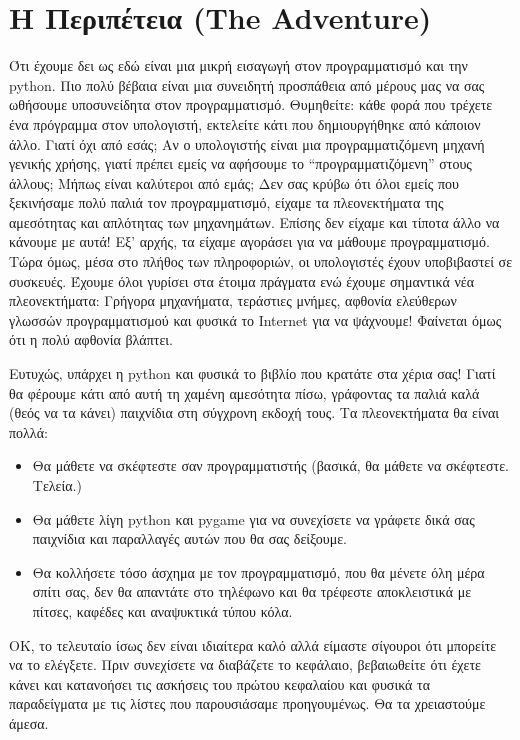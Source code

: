 \section {Η Περιπέτεια (The Adventure)}
%
Ότι έχουμε δει ως εδώ είναι μια μικρή εισαγωγή στον προγραμματισμό και την
python. Πιο πολύ βέβαια είναι μια συνειδητή προσπάθεια από μέρους
μας να σας ωθήσουμε υποσυνείδητα στον προγραμματισμό. Θυμηθείτε: κάθε φορά
που τρέχετε ένα πρόγραμμα στον υπολογιστή, εκτελείτε κάτι που δημιουργήθηκε
από κάποιον άλλο. Γιατί όχι από εσάς; Αν ο υπολογιστής είναι μια
προγραμματιζόμενη μηχανή γενικής χρήσης, γιατί πρέπει εμείς να αφήσουμε το
``προγραμματιζόμενη'' στους άλλους; Μήπως είναι καλύτεροι από εμάς;
Δεν σας κρύβω ότι όλοι εμείς που ξεκινήσαμε πολύ παλιά τον
προγραμματισμό, είχαμε τα πλεονεκτήματα της αμεσότητας και απλότητας των
μηχανημάτων. Επίσης δεν είχαμε και τίποτα άλλο να κάνουμε με αυτά! Εξ'
αρχής, τα είχαμε αγοράσει για να μάθουμε προγραμματισμό. Τώρα όμως, μέσα στο
πλήθος των πληροφοριών, οι υπολογιστές έχουν υποβιβαστεί σε συσκευές. Έχουμε
όλοι γυρίσει στα έτοιμα πράγματα ενώ έχουμε σημαντικά νέα πλεονεκτήματα:
Γρήγορα μηχανήματα, τεράστιες μνήμες, αφθονία ελεύθερων γλωσσών
προγραμματισμού και φυσικά το Internet για να ψάχνουμε! Φαίνεται όμως ότι η
πολύ αφθονία βλάπτει.

Ευτυχώς, υπάρχει η python και φυσικά το βιβλίο που κρατάτε στα χέρια σας!
Γιατί θα φέρουμε κάτι από αυτή τη χαμένη αμεσότητα πίσω, γράφοντας τα παλιά
καλά (θεός να τα κάνει) παιχνίδια στη σύγχρονη εκδοχή τους. Τα πλεονεκτήματα
θα είναι πολλά:
%
\begin{itemize}
\item Θα μάθετε να σκέφτεστε σαν προγραμματιστής (βασικά, θα μάθετε να σκέφτεστε.  Τελεία.)
\item Θα μάθετε λίγη python και pygame για να συνεχίσετε να γράφετε δικά σας παιχνίδια και παραλλαγές αυτών που θα σας δείξουμε.
\item Θα κολλήσετε τόσο άσχημα με τον προγραμματισμό, που θα μένετε όλη μέρα σπίτι σας, δεν θα απαντάτε στο τηλέφωνο και θα τρέφεστε αποκλειστικά με πίτσες,
καφέδες και αναψυκτικά τύπου κόλα.
\end{itemize}
%
ΟΚ, το τελευταίο ίσως δεν είναι ιδιαίτερα καλό αλλά είμαστε σίγουροι ότι
μπορείτε να το ελέγξετε.  Πριν συνεχίσετε να διαβάζετε το κεφάλαιο,
βεβαιωθείτε ότι έχετε κάνει και κατανοήσει τις ασκήσεις του πρώτου
κεφαλαίου και φυσικά τα παραδείγματα με τις λίστες που παρουσιάσαμε
προηγουμένως. Θα τα χρειαστούμε άμεσα.
%
